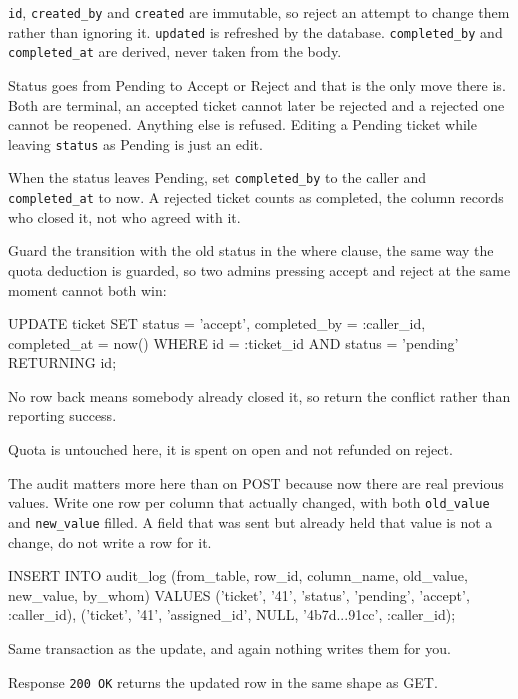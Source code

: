 \documentclass[12pt,letterpaper]{article}
\begin{document}
\texttt{id}, \texttt{created\_by} and \texttt{created} are immutable, so reject
an attempt to change them rather than ignoring it. \texttt{updated} is refreshed
by the database. \texttt{completed\_by} and \texttt{completed\_at} are derived,
never taken from the body.

Status goes from Pending to Accept or Reject and that is the only move there is.
Both are terminal, an accepted ticket cannot later be rejected and a rejected
one cannot be reopened. Anything else is refused. Editing a Pending ticket while
leaving \texttt{status} as Pending is just an edit.

When the status leaves Pending, set \texttt{completed\_by} to the caller and
\texttt{completed\_at} to now. A rejected ticket counts as completed, the column
records who closed it, not who agreed with it.

Guard the transition with the old status in the where clause, the same way the
quota deduction is guarded, so two admins pressing accept and reject at the same
moment cannot both win:

\begin{code}
UPDATE ticket
   SET status = 'accept',
       completed_by = :caller_id,
       completed_at = now()
 WHERE id = :ticket_id
   AND status = 'pending'
RETURNING id;
\end{code}

No row back means somebody already closed it, so return the conflict rather than
reporting success.

Quota is untouched here, it is spent on open and not refunded on reject.

The audit matters more here than on POST because now there are real previous
values. Write one row per column that actually changed, with both
\texttt{old\_value} and \texttt{new\_value} filled. A field that was sent but
already held that value is not a change, do not write a row for it.

\begin{code}
INSERT INTO audit_log
  (from_table, row_id, column_name,
   old_value, new_value, by_whom)
VALUES
  ('ticket', '41', 'status',
   'pending', 'accept', :caller_id),
  ('ticket', '41', 'assigned_id',
   NULL, '4b7d...91cc', :caller_id);
\end{code}

Same transaction as the update, and again nothing writes them for you.

Response \texttt{200 OK} returns the updated row in the same shape as GET.
\end{document}
